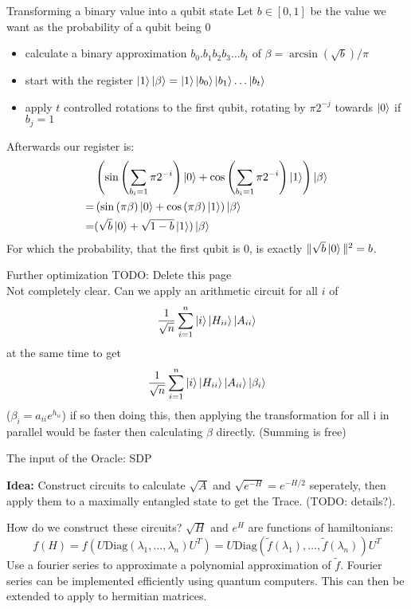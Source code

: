 \begin{frame}{Transforming a binary value into a qubit state}
Let $b\in [0,1]$ be the value we want as the probability of a qubit being 0
\begin{itemize}
\item calculate a binary approximation $b_0.b_1b_2b_3\ldots b_t$ of $\beta=\arcsin(\sqrt{b})/\pi$
\item start with the register $\ket{1}\ket{\beta}=\ket{1}\ket{b_0}\ket{b_1}\ldots\ket{b_t}$
\item apply $t$ controlled rotations to the first qubit, rotating by $\pi 2^{-j}$ towards $\ket{0}$ if $b_j=1$
\end{itemize}
Afterwards our register is: 
\begin{align*}
&\left(\sin\left(\sum_{b_i=1} \pi 2^{-i}\right)\ket{0}
+\cos\left(\sum_{b_i=1} \pi 2^{-i}\right)\ket{1}\right)
 \ket{\beta}\\
=&\left(\sin\left(\pi\beta\right)\ket{0}
+\cos\left(\pi\beta\right)\ket{1}\right)
 \ket{\beta}\\
=&(\sqrt{b}\ket{0}+\sqrt{1-b}\ket{1})\ket{\beta}
\end{align*}
For which the probability, that the first qubit is 0, is exactly $\|\sqrt{b}\ket{0}\|^2=b$.
\end{frame}

\begin{frame}{Further optimization}
TODO: Delete this page\\
Not completely clear.  Can we apply an arithmetic circuit for all $i$ of 
\begin{equation*}
\frac{1}{\sqrt{n}}\sum_{i=1}^n\ket{i}\ket{H_{ii}}\ket{A_{ii}}
\end{equation*}
at the same time to get
\begin{equation*}
\frac{1}{\sqrt{n}}\sum_{i=1}^n\ket{i}\ket{H_{ii}}\ket{A_{ii}}\ket{\beta_i}
\end{equation*}
($\beta_i=a_{ii}e^{h_{ii}}$)
if so then doing this, then applying the transformation for all i in parallel would be faster then calculating $\beta$ directly. (Summing is free)

\end{frame}

\begin{frame}{The input of the Oracle: SDP}

\textbf{Idea: } Construct circuits to calculate $\sqrt{A}$ and $\sqrt{e^{-H}}=e^{-H/2}$ seperately, then apply them to a maximally entangled state to get the Trace. (TODO: details?). 

\begin{block}{How do we construct these circuits?}
$\sqrt{H}$ and $e^{H}$ are functions of hamiltonians:
\begin{equation*}
f(H)=f(U \mathrm{Diag}(\lambda_1,\ldots, \lambda_n) U^T)=U \mathrm{Diag}(\tilde{f}(\lambda_1),\ldots,\tilde{f}(\lambda_n))U^T
\end{equation*}
Use a fourier series to approximate a polynomial approximation of $\tilde{f}$. Fourier series can be implemented efficiently using quantum computers. This can then be extended to apply to hermitian matrices.
\end{block}
\end{frame}

